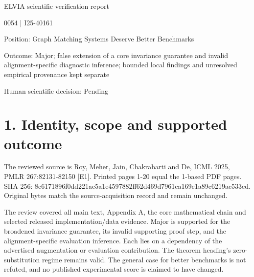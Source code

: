 \documentclass[10pt]{article}
\begin{document}
ELVIA scientific verification report\par
0054 | I25-40161\par
Position: Graph Matching Systems Deserve Better Benchmarks\par
Outcome: Major; false extension of a core invariance guarantee and invalid alignment-specific diagnostic inference; bounded local findings and unresolved empirical provenance kept separate\par
Human scientific decision: Pending\par
\section*{1. Identity, scope and supported outcome}
The reviewed source is Roy, Meher, Jain, Chakrabarti and De, ICML 2025, PMLR 267:82131-82150 [E1]. Printed pages 1-20 equal the 1-based PDF pages. SHA-256: 8c6171896f0dd221ac5a1e4597882ff62d469d7961ca169c1a89c6219ac533ed. Original bytes match the source-acquisition record and remain unchanged.\par
The review covered all main text, Appendix A, the core mathematical chain and selected released implementation/data evidence. Major is supported for the broadened invariance guarantee, its invalid supporting proof step, and the alignment-specific evaluation inference. Each lies on a dependency of the advertised augmentation or evaluation contribution. The theorem heading’s zero-substitution regime remains valid. The general case for better benchmarks is not refuted, and no published experimental score is claimed to have changed.\par
\end{document}
